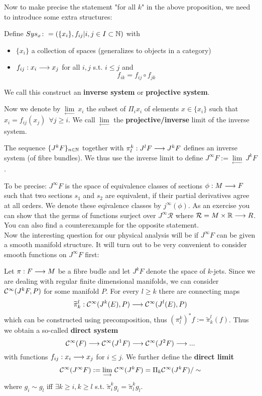 Now to make precise the statement "for all $k$" in the above proposition, we need to introduce some extra structures:

\begin{definition}
\label{def:inverse_system}
  Define $Sys_x \colon = (\{x_i\}, f_{ij} | i,j \in I \subset \mathbb{N})$ with
  \begin{itemize}
    \item $\{x_i\}$ a collection of spaces (generalizes to objects in a category)
    \item $f_{ij}:x_i \longrightarrow x_j$ for all $i,j$ s.t. $i \leq j$ and
    $$ f_{ik} = f_{ij} \circ f_{jk} $$
  \end{itemize}
  We call this construct an \textbf{inverse system} or \textbf{projective system}.
\end{definition}

Now we denote by $\underset{\longleftarrow}{\lim} \ x_i$ the subset of $\Pi_i x_i$ of elements $x\in \{ x_i\}$ such that $x_i = f_{ij}(x_j) \ \ \forall j \geq i$. We call $\underset{\longleftarrow}{\lim}$ the \textbf{projective/inverse} limit of the inverse system.

\begin{definition}
  The sequence $\{J^k F\}_{n\in\mathbb{N}}$ together with $\pi^k_l: J^l F \longrightarrow J^k F$ defines an inverse system (of fibre bundles). We thus use the inverse limit to define $J^\infty F := \underset{\longleftarrow}{\lim}\ J^k F$.
\end{definition}

To be precise: $J^\infty F$ is the space of equivalence classes of sections $\phi:M \lra F$ such that two sections $s_1$ and $s_2$ are equivalent, if their partial derivatives agree at all orders. We denote these eqivalence classes by $j^\infty(\phi)$. As an exercise you can show that the germs of functions surject over $J^\infty \mathcal{R}$ where $\mathcal{R} = M \times \mathbb{R} \longrightarrow R$. You can also find a counterexample for the opposite statement.\\

Now the interesting question for our physical analysis will be if $J^\infty F$ can be given a smooth manifold structure. It will turn out to be very convenient to consider smooth functions on $J^\infty F$ first:

\begin{definition}
  Let $\pi: F \longrightarrow M$ be a fibre budle and let $J^kF$ denote the space of $k$-jets. Since we are dealing with regular finite dimensional manifolds, we can consider $\mathcal{C}^{\infty}(J^kF, P)$ for some manifold $P$. For every $l\geq k$ there are connecting maps
  $$\widetilde \pi^l_k : \mathcal{C}^{\infty}(J^k(E), P) \longrightarrow \mathcal{C}^{\infty}(J^l(E), P)$$
  which can be constructed using precomposition, thus $(\pi^k_l)^* f := \widetilde \pi^l_k (f)$. Thus we obtain a so-called \textbf{direct system}
  $$ \mathcal{C}^{\infty}(F) \longrightarrow \mathcal{C}^{\infty}(J^1F) \longrightarrow \mathcal{C}^{\infty}(J^2F) \longrightarrow ... $$
  with functions $f_{ij}:x_i \longrightarrow x_j$ for $i\leq j$. We further define the \textbf{direct limit}
  $$\mathcal{C}^{\infty}(J^\infty F) := \underset{\longrightarrow}{\lim}\ \mathcal{C}^{\infty}(J^k F) = \Pi_k \mathcal{C}^{\infty}(J^k F) / \sim$$
  where $g_i \sim g_l$ iff $\exists k \geq i, k \geq l$ s.t. $\widetilde \pi^k_i g_i = \widetilde \pi^k_l g_l$.
\end{definition}


